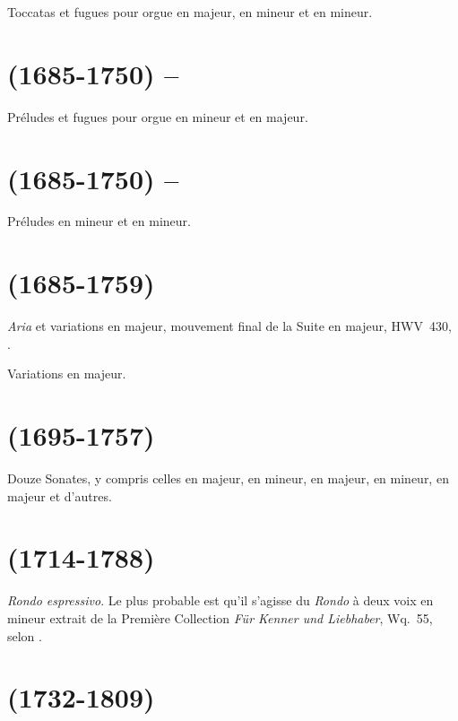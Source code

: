 Toccatas et fugues pour orgue en \kC majeur, en \kD mineur et en \kE mineur.

\section[%
Johann Sebastian Bach (1685-1750) -- Ferenc Liszt]{%
\JBach{} (1685-1750) -- \FLiszt{}}

Préludes et fugues pour orgue en \kA mineur et en \kD majeur.

\section[%
Johann Sebastian Bach (1685-1750) -- Aleksandr Ziloti]{%
\JBach{} (1685-1750) -- \AZiloti{}}

Préludes en \kE mineur et en \kB mineur.

\section[%
Georg Friedrich Haendel (1685-1759)]{%
\GHaendel{} (1685-1759)}

\emph{Aria} et variations en \kE majeur, mouvement final de la Suite
 en \kE majeur, HWV~430, .

Variations en \kB \Flat majeur.

\section[%
Domenico Scarlatti (1695-1757)]{%
\DScarlatti{} (1695-1757)}

Douze Sonates, y compris celles en \kA majeur, en \kB mineur, en \kG majeur,
en \kE mineur, en \kD majeur et d'autres.

\section[%
Carl Philipp Emanuel Bach (1714-1788)]{%
\CBach{} (1714-1788)}

\emph{Rondo espressivo}.
Le plus probable est qu'il s'agisse du \emph{Rondo} à deux voix en \kB
mineur extrait de la Première Collection \emph{Für Kenner und Liebhaber},
Wq.~55, selon \citet[p.~72, note~3]{White}.

\section[%
Joseph Haydn (1732-1809)]{%
\JHaydn{} (1732-1809)}

